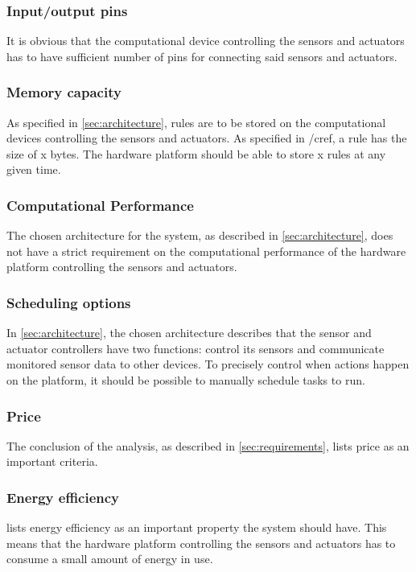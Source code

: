 \subsubsection{Input/output pins}
It is obvious that the computational device controlling the sensors and actuators has to have sufficient number of pins for connecting said sensors and actuators.

\subsubsection{Memory capacity}
As specified in \cref{sec:architecture}, rules are to be stored on the computational devices controlling the sensors and actuators. As specified in /cref{}, a rule has the size of x  bytes. The hardware platform should be able to store x  rules at any given time.

\subsubsection{Computational Performance}
The chosen architecture for the system, as described in \cref{sec:architecture}, does not have a strict requirement on the computational performance of the hardware platform controlling the sensors and actuators.

\subsubsection{Scheduling options}
In \cref{sec:architecture}, the chosen architecture describes that the sensor and actuator controllers have two functions: control its sensors and communicate monitored sensor data to other devices. To precisely control when actions happen on the platform, it should be possible to manually schedule tasks to run.

\subsubsection{Price}
The conclusion of the analysis, as described in \cref{sec:requirements}, lists price as an important criteria.

\subsubsection{Energy efficiency}
 lists energy efficiency as an important property the system should have. This means that the hardware platform controlling the sensors and actuators has to consume a small amount of energy in use.

